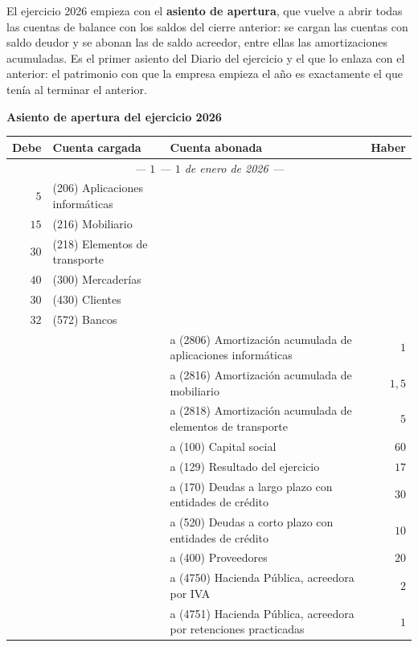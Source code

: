 \documentclass[10pt,a4paper]{article}
\begin{document}
El ejercicio 2026 empieza con el \textbf{asiento de apertura}, que vuelve a abrir todas las cuentas de balance con los saldos del cierre anterior: se cargan las cuentas con saldo deudor y se abonan las de saldo acreedor, entre ellas las amortizaciones acumuladas. Es el primer asiento del Diario del ejercicio y el que lo enlaza con el anterior: el patrimonio con que la empresa empieza el año es exactamente el que tenía al terminar el anterior.

\begin{center}\begin{minipage}{\linewidth}\centering
{\small\textbf{Asiento de apertura del ejercicio 2026}}\par\vspace{0.3em}
{\small
\begin{tabular}{r p{5.6cm} p{6.4cm} r}
\hline
\textbf{Debe} & \textbf{Cuenta cargada} & \textbf{Cuenta abonada} & \textbf{Haber} \\
\hline
\multicolumn{4}{c}{\textit{--- $1$ --- $1$ de enero de 2026 ---}} \\
$5$ & (206) Aplicaciones informáticas & & \\
$15$ & (216) Mobiliario & & \\
$30$ & (218) Elementos de transporte & & \\
$40$ & (300) Mercaderías & & \\
$30$ & (430) Clientes & & \\
$32$ & (572) Bancos & & \\
 & & \raggedright a (2806) Amortización acumulada de aplicaciones informáticas & $1$ \\
 & & \raggedright a (2816) Amortización acumulada de mobiliario & $1,5$ \\
 & & \raggedright a (2818) Amortización acumulada de elementos de transporte & $5$ \\
 & & \raggedright a (100) Capital social & $60$ \\
 & & \raggedright a (129) Resultado del ejercicio & $17$ \\
 & & \raggedright a (170) Deudas a largo plazo con entidades de crédito & $30$ \\
 & & \raggedright a (520) Deudas a corto plazo con entidades de crédito & $10$ \\
 & & \raggedright a (400) Proveedores & $20$ \\
 & & \raggedright a (4750) Hacienda Pública, acreedora por IVA & $2$ \\
 & & \raggedright a (4751) Hacienda Pública, acreedora por retenciones practicadas & $1$ \\

\end{tabular}}
\end{minipage}
\end{center}
\end{document}
